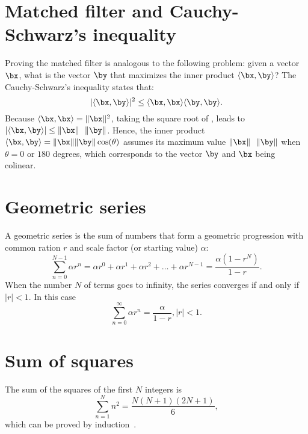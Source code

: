 \section{Matched filter and Cauchy-Schwarz's inequality}
\label{sec:Cauchy-Schwarz}
Proving the matched filter is analogous to the following problem: given a vector $\bx$, what is the vector $\by$ that maximizes the inner product $\langle\bx,\by\rangle$? The Cauchy-Schwarz's inequality states that:
\begin{equation}
\lvert\langle\bx,\by\rangle\rvert^2 \le \langle\bx,\bx\rangle \langle\by,\by\rangle.
\label{eq:cauchy_schwarz}
\end{equation}
Because $\langle\bx,\bx\rangle = \lVert\bx\rVert^2$, taking the square root of , leads to $\lvert\langle\bx,\by\rangle\rvert \le \lVert\bx\rVert \textrm{~~} \lVert\by\rVert$. Hence, the inner product $\langle\bx,\by\rangle = \lVert\bx\rVert \lVert\by\rVert \cos(\theta)$ assumes its maximum value $\lVert\bx\rVert \textrm{~~} \lVert\by\rVert$ when $\theta=0$ or $180$ degrees, which corresponds to the vector $\by$ and $\bx$ being colinear.
 

\section{Geometric series}

A geometric series is the sum of numbers that form a geometric progression with common ration $r$ and scale factor (or starting value) $\alpha$:
\[
\sum_{n=0}^{N-1} \alpha r^n = \alpha r^0 + \alpha r^1 + \alpha r^2 + \ldots + \alpha r^{N-1} = \frac{\alpha (1 - r^N ) }{1 - r}.
\]
When the number $N$ of terms goes to infinity, the series converges if and only if $|r|<1$. In this case
\begin{equation}
\sum_{n=0}^{\infty} \alpha r^n = \frac{\alpha}{1 - r}, |r|<1.
\label{eq:sum_inf_pg}
\end{equation}

\section{Sum of squares}

The sum of the squares of the first $N$ integers is
\begin{equation}
\sum_{n=1}^N n^2 = \frac{N(N+1)(2N+1)}{6},
\label{eq:sum_of_squares}
\end{equation}
which can be proved by induction~.

